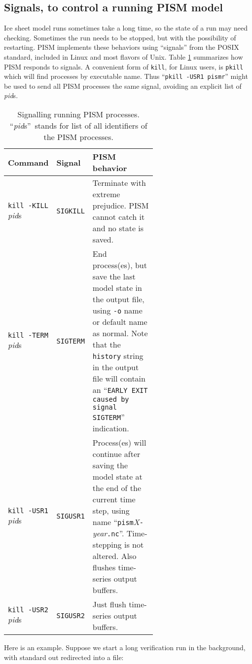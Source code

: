 \newcommand\pid{\textsl{pid}s}

\subsection{Signals, to control a running PISM model} \label{subsect:signal}    Ice sheet model runs sometimes take a long time, so the state of a run may need checking.  Sometimes the run needs to be stopped, but with the possibility of restarting.  PISM implements these behaviors using ``signals'' from the POSIX standard, included in Linux and most flavors of Unix.  Table \ref{tab:signals} summarizes how PISM responds to signals.  A convenient form of \texttt{kill}, for Linux users, is \texttt{pkill} which will find processes by executable name.  Thus ``\texttt{pkill -USR1 pismr}'' might be used to send all PISM processes the same signal, avoiding an explicit list of \pid.

\begin{table}[ht]
\centering
\begin{tabular}{llp{0.60\linewidth}}\toprule
\textbf{Command} & \textbf{Signal} & \textbf{PISM behavior} \\
\midrule
\texttt{kill -KILL} \pid & \texttt{SIGKILL} & Terminate with extreme prejudice. PISM cannot catch it and no state is saved. \\
\texttt{kill -TERM} \pid & \texttt{SIGTERM} & End process(es), but save the last model state in the output file, using \texttt{-o} name or default name as normal.  Note that the \texttt{history} string in the output file will contain an ``\texttt{EARLY EXIT caused by signal SIGTERM}'' indication. \\
\texttt{kill -USR1} \pid & \texttt{SIGUSR1} & Process(es) will continue after saving the model state at the end of the current time step, using name ``\texttt{pism}\textsl{X}\texttt{-}\textsl{year}\texttt{.nc}''.  Time-stepping is not altered.  Also flushes time-series output buffers. \\
\texttt{kill -USR2} \pid & \texttt{SIGUSR2} & Just flush time-series output buffers.\index{signals!USR2} \\
\bottomrule
\end{tabular}
\caption{Signalling running PISM processes.  ``\pid''~stands for list of all identifiers of the PISM processes.}
\label{tab:signals}
\end{table}

Here is an example.  Suppose we start a long verification run in the
background, with standard out redirected into a file: 


